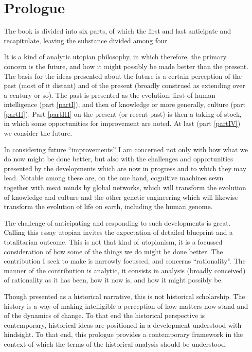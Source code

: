 
\mainmatter

\part{Prologue}\label{part0}


The book is divided into six parts, of which the first and last anticipate and recapitulate, leaving the substance divided among four.

It is a kind of analytic utopian philosophy, in which therefore, the primary concern is the future, and how it might possibly be made better than the present.
The basis for the ideas presented about the future is a certain perception of the past (most of it distant) and of the present (broadly construed as extending over a century or so).
The past is presented as the evolution, first of human intelligence (part \ref{partI}), and then of knowledge or more generally, culture (part \ref{partII}).
Part \ref{partIII} on the present (or recent past) is then a taking of stock, in which some opportunities for improvement are noted.
At last (part \ref{partIV}) we consider the future.

In considering future ``improvements'' I am concerned not only with how what we do now might be done better, but also with the challenges and opportunities presented by the developments which are now in progress and to which they may lead.
Notable among these are, on the one hand, cognitive machines sewn together with meat minds by global networks, which will transform the evolution of knowledge and culture and the other genetic engineering which will likewise transform the evolution of life on earth, including the human genome.

The challenge of anticipating and responding to such developments is great.
Calling this essay utopian invites the expectation of detailed blueprint and a totalitarian outcome.
This is not that kind of utopianism, it is a focussed consideration of how some of the things we do might be done better.
The contribution I seek to make is narrowly focussed, and concerns ``rationality''.
The manner of the contribution is analytic, it consists in analysis (broadly conceived) of rationality as it has been, how it now is, and how it might possibly be.

Though presented as a historical narrative, this is not historical scholarship.
The history is a way of making intelligible a perception of how matters now stand and of the dynamics of change.
To that end the historical perspective is contemporary, historical ideas are positioned in a development understood with hindsight.
To that end, this prologue provides a contemporary framework in the context of which the terms of the historical analysis should be understood.


